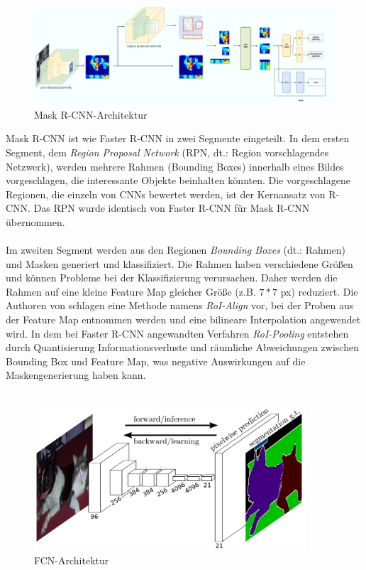\begin{figure}[ht]
  \centering
  \includegraphics[width=\textwidth]{pics/maskrcnn-archtecture.PNG}
  \caption[Mask R-CNN-Architektur]{Mask R-CNN-Architektur\cite{ref:mask-rcnn-architecture}}
  \label{fig:maskrcnn-architecture}
\end{figure}

\noindent
Mask R-CNN ist wie Faster R-CNN in zwei Segmente eingeteilt. In dem ersten Segment, dem \textit{Region Proposal Network} (RPN, dt.: Region vorschlagendes Netzwerk), werden mehrere Rahmen (Bounding Boxes) innerhalb eines Bildes vorgeschlagen, die interessante Objekte beinhalten könnten.\cite{ref:faster-r-cnn} Die vorgeschlagene Regionen, die einzeln von CNNs bewertet werden, ist der Kernansatz von R-CNN. Das RPN wurde identisch von Faster R-CNN für Mask R-CNN übernommen.\cite{ref:maskrcnn} 
\\\\
Im zweiten Segment werden aus den Regionen \textit{Bounding Boxes} (dt.: Rahmen) und Masken generiert und klassifiziert. Die Rahmen haben verschiedene Größen und können Probleme bei der Klassifizierung verursachen. Daher werden die Rahmen auf eine kleine Feature Map gleicher Größe (z.B. $7*7$ px) reduziert. Die Authoren von \cite{ref:maskrcnn} schlagen eine Methode namens \textit{RoI-Align} vor, bei der Proben aus der Feature Map entnommen werden und eine bilineare Interpolation angewendet wird. In dem bei Faster R-CNN angewandten Verfahren \textit{RoI-Pooling} entstehen durch Quantisierung Informationsverluste und räumliche Abweichungen zwischen Bounding Box und Feature Map, was negative Auswirkungen auf die Maskengenerierung haben kann.\cite{ref:maskrcnn}
\\\\
\begin{figure}[ht]
  \centering
  \includegraphics[width=0.90\textwidth]{pics/fcn-architecture.PNG}
  \caption[FCN-Architektur]{FCN-Architektur\cite{ref:mask-rcnn-architecture}}
  \label{fig:fcn-architecture}
\end{figure}
